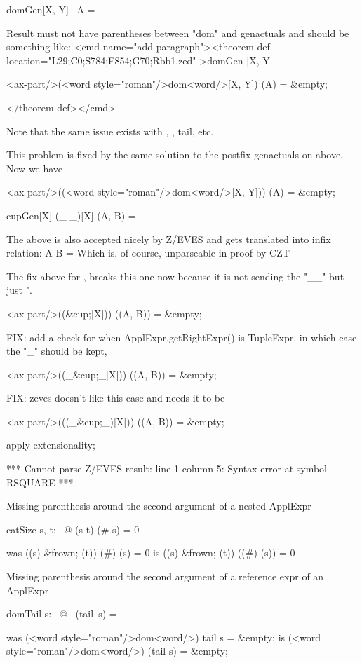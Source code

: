 \begin{theorem}{domGen}[X, Y]
     \dom[X, Y]~A = \emptyset
\end{theorem}
 Result must not have parentheses between "dom" and genactuals and should be something like:
<cmd name="add-paragraph"><theorem-def location="L29;C0;S784;E854;G70;Rbb1.zed"   >domGen
[X, Y]

<ax-part/>(<word style="roman"/>dom<word/>[X, Y]) (A)  =  &empty;

</theorem-def></cmd>

 Note that the same issue exists with \bigcap, \bigcup, tail, etc.

This problem is fixed by the same solution to the postfix genactuals on \inv above. Now we have

<ax-part/>((<word style="roman"/>dom<word/>[X, Y])) (A)  =  &empty;

\begin{theorem}{cupGen}[X]
    (\_ \cup \_)[X] (A, B) = \emptyset
\end{theorem}
 The above is also accepted nicely by Z/EVES and gets translated into infix relation:
  A \cup[X] B = \emptyset
 Which is, of course, unparseable in proof by CZT

The fix above for \inv, breaks this one now because it is not sending the "_\cup_" but just "\cup.

<ax-part/>((&cup;[X])) ((A, B))  =  &empty;

FIX: add a check for when ApplExpr.getRightExpr() is TupleExpr, in which case the "_" should be kept,

<ax-part/>((_&cup;_[X])) ((A, B))  =  &empty;

FIX: zeves doesn't like this case and needs it to be

<ax-part/>(((_&cup;_)[X])) ((A, B))  =  &empty;

\begin{zproof}[cupGen]
   apply extensionality;
\end{zproof}
***
Cannot parse Z/EVES result:
line 1 column 5: Syntax error at symbol RSQUARE
***

Missing parenthesis around the second argument of a nested ApplExpr
\begin{theorem}{catSize}
\forall  s, t: \seq~\nat @ (s \cat  t) (\# s) = 0
\end{theorem}
was ((s) &frown; (t)) (#) (s)  =  0
is  ((s) &frown; (t)) ((#) (s))  =  0

Missing parenthesis around the second argument of a reference expr of an ApplExpr
\begin{theorem}{domTail}
\forall  s: \seq~\nat @ \dom~(tail~s) = \emptyset
\end{theorem}
was (<word style="roman"/>dom<word/>) tail s  =  &empty;
is  (<word style="roman"/>dom<word/>) (tail s)  =  &empty;